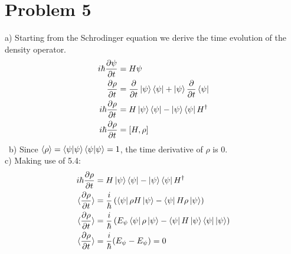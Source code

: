 \documentclass[a4paper,11pt]{article}
\numberwithin{equation}{section}
\begin{document}
\section{Problem 5}
a) Starting from the Schrodinger equation we derive the time evolution of the density operator.
\begin{align}
 i\hbar\frac{\partial \psi}{\partial t} &= H\psi\\
 \frac{\partial \rho}{\partial t} &= \frac{\partial}{\partial t}\ket{\psi}\bra{\psi}+\ket{\psi}\frac{\partial}{\partial t}\bra{\psi}\\
 i\hbar\frac{\partial \rho}{\partial t} &= H\ket{\psi}\bra{\psi}-\ket{\psi}\bra{\psi}H^\dagger\\
 i\hbar\frac{\partial \rho}{\partial t} &= [H,\rho]
\end{align}
\
b) Since $\braket{\rho}=\braket{\psi|\psi}\braket{\psi|\psi}=1$, the time derivative of $\rho$ is 0.
\\
c) Making use of 5.4:
\begin{align}
 i\hbar\frac{\partial \rho}{\partial t} &= H\ket{\psi}\bra{\psi}-\ket{\psi}\bra{\psi}H^\dagger\\
 \braket{\frac{\partial \rho}{\partial t}} &= \frac{i}{\hbar}\left(\bra{\psi}\rho H\ket{\psi}
	  -\bra{\psi}H\rho\ket{\psi} \right)\\
 \braket{\frac{\partial \rho}{\partial t}} &= \frac{i}{\hbar}\left(E_\psi\bra{\psi}\rho\ket{\psi}
	  -\bra{\psi}H\ket{\psi}\bra{\psi}\ket{\psi}\right)\\
 \braket{\frac{\partial \rho}{\partial t}} &= \frac{i}{\hbar}(E_\psi-E_\psi)=0
\end{align}
 
\end{document}
